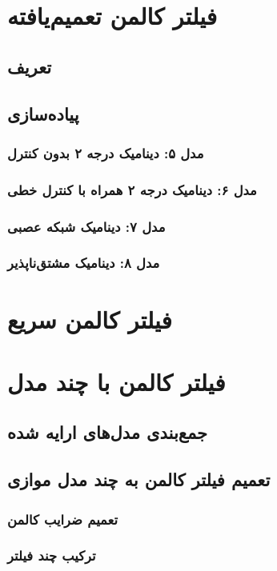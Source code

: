 \documentclass{scribe-cgenomics}
\begin{document}
\section{فیلتر کالمن تعمیم‌یافته}

\subsection{تعریف}
\subsection{پیاده‌سازی}
\subsubsection{مدل ۵: دینامیک درجه ۲ بدون کنترل}
\subsubsection{مدل ۶: دینامیک درجه ۲ همراه با کنترل خطی}
\subsubsection{مدل ۷: دینامیک شبکه عصبی}
\subsubsection{مدل ۸: دینامیک مشتق‌ناپذیر}


\section{فیلتر کالمن سریع}


\section{فیلتر کالمن با چند مدل}
\subsection{جمع‌بندی مدل‌های ارایه شده}
\subsection{تعمیم فیلتر کالمن به چند مدل موازی}
\subsubsection{تعمیم ضرایب کالمن}
\subsubsection{ترکیب چند فیلتر}
\end{document}
